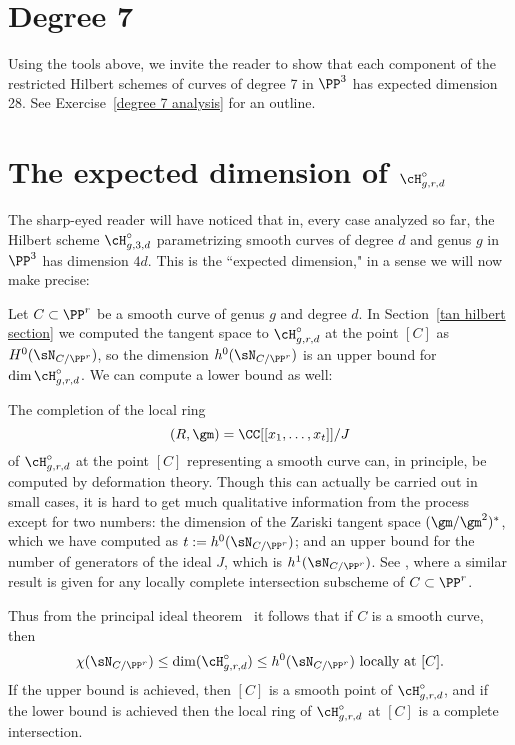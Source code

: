 \section{Degree 7}

Using the tools above, we invite the reader to show that each component of the restricted Hilbert schemes of curves of degree 7
in $\PP^3$ has expected dimension 28. See Exercise~\ref{degree 7 analysis} for an outline.

 
\section{The expected dimension of $\cH^\circ_{g,r,d}$}\label{chi N}


The sharp-eyed reader will have noticed that in, every case analyzed so far,  the Hilbert scheme
$\cH^\circ_{g,3,d}$ parametrizing smooth curves of degree $d$ and genus $g$ in $\PP^3$ has dimension $4d$. 
 This is the ``expected dimension,"  in a sense we will now make precise:


Let $C\subset \PP^r$ be a smooth curve of genus $g$ and degree $d$. In Section~\ref{tan hilbert section}
we computed the tangent space to $\cH^\circ_{g,r,d}$ at the point $[C]$ as $H^0(\sN_{C/\PP^r})$, so 
the dimension $h^0( \sN_{C/\PP^r})$ is an upper bound for $\dim \cH^\circ_{g,r,d}$. We can compute a lower bound as well:


\begin{fact}\label{deformation bound}
The completion of the local ring 
$$
(R,\gm) = \CC[[ x_1,\dots, x_t]]/J
$$ 
of $\cH^\circ_{g,r,d}$ at the point $[C]$ representing a smooth curve can, in principle, be computed by deformation theory.
Though this can actually be carried out in small cases, it is hard to get much qualitative information from the process
except for two numbers: the dimension of the Zariski tangent space $(\gm/\gm^{2})^{*}$, which we have computed as 
$t:= h^0(\sN_{C/\PP^r})$; 
and an upper bound for the number of generators of the ideal $J$, which is 
$h^1(\sN_{C/\PP^r})$. See
\cite[Corollaries 6.2.5, 6.4.11 and Proposition 6.5.2]{MR2223408}, where a similar result is given for any
locally complete intersection subscheme of $C\subset \PP^r$.

Thus from the principal ideal theorem~\cite[Theorem 10.2]{Eisenbud1995} it follows that if $C$ is a smooth curve, then 
$$
\chi(\sN_{C/\PP^r}) \leq \dim (\cH^\circ_{g,r,d})\leq h^0(\sN_{C/\PP^r}) \hbox{ locally at } [C].
$$
If the upper bound is achieved, then $[C]$ is a smooth point of $\cH^\circ_{g,r,d}$, and if the lower bound is achieved
then the local ring of $\cH^\circ_{g,r,d}$ at $[C]$ is a complete intersection.
\end{fact}

